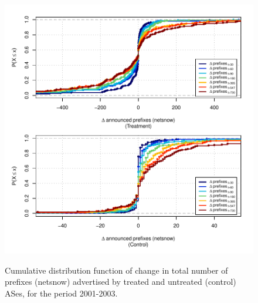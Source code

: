 \clearpage
\vspace*{1.25em}
\begin{figure}[H]
\begin{centering}
\begin{singlespace}
\captionsetup{list=no}
    \includegraphics[width=6in]{figures/behavior-netsnow-2001_2003-corr.pdf}
    \vspace{-2em}\\
    \caption{Cumulative distribution function of change in total number of
    prefixes (netsnow) advertised by treated and untreated (control) ASes, for
    the period 2001-2003.}
\end{singlespace}
\end{centering}
\end{figure}

